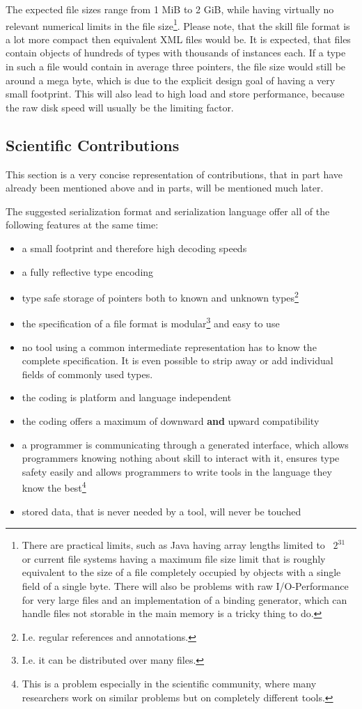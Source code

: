 The expected file sizes range from 1 MiB to 2 GiB, while having virtually no relevant numerical limits in the file size\footnote{There are practical limits, such as Java having array lengths limited to ~$2^{31}$ or current file systems having a maximum file size limit that is roughly equivalent to the size of a file completely occupied by objects with a single field of a single byte. There will also be problems with raw I/O-Performance for very large files and an implementation of a binding generator, which can handle files not storable in the main memory is a tricky thing to do.}. Please note, that the skill file format is a lot more compact then equivalent XML files would be.
It is expected, that files contain objects of hundreds of types with thousands of instances each. If a type in such a file would contain in average three pointers, the file size would still be around a mega byte, which is due to the explicit design goal of having a very small footprint. This will also lead to high load and store performance, because the raw disk speed will usually be the limiting factor.


\subsection{Scientific Contributions}

This section is a very concise representation of contributions, that in part have already been mentioned above and in parts, will be mentioned much later.

The suggested serialization format and serialization language offer all of the following features at the same time:
\begin{itemize}
 \item a small footprint and therefore high decoding speeds
 \item a fully reflective type encoding
 \item type safe storage of pointers both to known and unknown types\footnote{I.e. regular references and annotations.}
 \item the specification of a file format is modular\footnote{I.e. it can be distributed over many files.} and easy to use
 \item no tool using a common intermediate representation has to know the complete specification. It is even possible to strip away or add individual fields of commonly used types.
 \item the coding is platform and language independent
 \item the coding offers a maximum of downward \textbf{and} upward compatibility
 \item a programmer is communicating through a generated interface, which allows programmers knowing nothing about skill to interact with it, ensures type safety easily and allows programmers to write tools in the language they know the best\footnote{This is a problem especially in the scientific community, where many researchers work on similar problems but on completely different tools.}
 \item stored data, that is never needed by a tool, will never be touched
\end{itemize}

